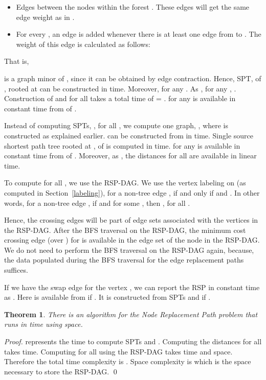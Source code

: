 \documentclass[11pt,a4paper]{llncs}
\newtheorem{thm}{Theorem}
\begin{document}
\begin{itemize}
  \item Edges between the nodes within the forest .
        These edges will get the same edge weight as in .
  \item For every , an edge  is added whenever there
       is at least one edge from  to .
       The weight of this edge is calculated as follows:
       
  \end{itemize}
That is,


 is a graph minor of , since it can be obtained by edge contraction.
Hence, SPT,  of , rooted at  can be constructed in  time.
Moreover,  for any .
As , for any , .
Construction of  and  for all  takes a total time of  = .
 for any  is available in constant time from  of .

Instead of computing  SPTs, , for all , we compute one graph,
, where  is constructed as explained earlier.
 can be constructed from  in  time. Single source shortest path tree rooted at ,
 of  is computed in  time. 
for any  is available in constant time from  of .
Moreover, as ,
the distances  for all  are available in linear time.

To compute  for all , we use the RSP-DAG. We use the vertex labeling on  (as computed in Section~\ref{labeling}),
for a non-tree edge , 
if and only if  and . In other words, for a non-tree edge , if 
and  for some , then , for all .

Hence, the crossing edges  will be part
of edge sets associated with the vertices  in the RSP-DAG. After the BFS traversal on the RSP-DAG,
the minimum cost crossing edge (over ) for  is available in the edge set of the node  in the RSP-DAG.
We do not need to perform the BFS traversal on the RSP-DAG again, because, the data populated during the BFS traversal for the edge replacement
paths suffices.

If we have the swap edge  for the vertex ,
we can report the RSP in constant time as . Here 
is available from  if . It is constructed from SPTs  and   if
.

\begin{thm}
\label{thm3}
There is an algorithm for the
Node Replacement Path problem that runs in  time using  space.
\end{thm}

\begin{proof}
 represents the time to compute SPTs  and .
Computing the distances  for all  takes  time.
Computing  for all  using the RSP-DAG takes  time
and  space. Therefore the total time complexity is .
Space complexity is  which is the space necessary to store the RSP-DAG.
\qed
\end{proof}
\end{document}
